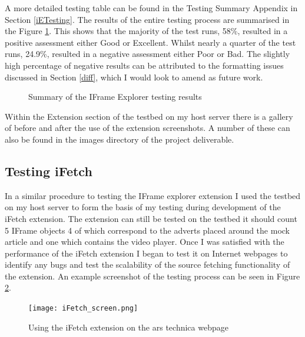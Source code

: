 \documentclass[12pt]{article}
\begin{document}
A more detailed testing table can be found in the Testing Summary Appendix in Section \ref{iETesting}. The results of the entire testing process are summarised in the Figure \ref{fig:iePie}. This shows that the majority of the test runs, 58\%, resulted in a positive assessment either Good or Excellent. Whilst nearly a quarter of the test runs, 24.9\%, resulted in a negative assessment either Poor or Bad. The slightly high percentage of negative results can be attributed to the formatting issues discussed in Section \ref{diff}, which I would look to amend as future work. 

\begin{figure} [H]
    \centering
        \caption{Summary of the IFrame Explorer testing results}
        \label{fig:iePie}
\end{figure}


Within the Extension section of the testbed on my host server there is a gallery of before and after the use of the extension screenshots. A number of these can also be found in the images directory of the project deliverable. 

\subsection{Testing iFetch}
In a similar procedure to testing the IFrame explorer extension I used the testbed on my host server to form the basis of my testing during development of the iFetch extension. The extension can still be tested on the testbed it should count 5 IFrame objects 4 of which correspond to the adverts placed around the mock article and one which contains the video player. Once I was satisfied with the performance of the iFetch extension I began to test it on Internet webpages to identify any bugs and test the scalability of the source fetching functionality of the extension. An example screenshot of the testing process can be seen in Figure \ref{fig:iFetch_screen}.  

\begin{figure}[H]
    \centering
    \texttt{[image: iFetch\_screen.png]}
    \caption{Using the iFetch extension on the ars technica webpage}
    \label{fig:iFetch_screen}
\end{figure}
\end{document}
